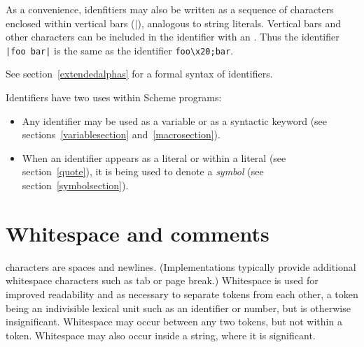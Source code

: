 As a convenience, idenfitiers may also be written as a sequence of
characters enclosed within vertical bars ({\cf $|$}), analogous to
string literals.  Vertical bars and other characters can be included
in the identifier with an .  Thus the
identifier \verb+|foo bar|+ is the same as the identifier
\verb+foo\x20;bar+.

See section~\ref{extendedalphas} for a formal syntax of identifiers.

\vest Identifiers have two uses within Scheme programs:
\begin{itemize}
\item Any identifier may be used as a variable
 or as a syntactic keyword
(see sections~\ref{variablesection} and~\ref{macrosection}).

\item When an identifier appears as a literal or within a literal
(see section~\ref{quote}), it is being used to denote a {\em symbol}
(see section~\ref{symbolsection}).

\end{itemize}

%
%


\section{Whitespace and comments}

 characters are spaces and newlines.
(Implementations typically provide additional whitespace characters such
as tab or page break.)  Whitespace is used for improved readability and
as necessary to separate tokens from each other, a token being an
indivisible lexical unit such as an identifier or number, but is
otherwise insignificant.  Whitespace may occur between any two tokens,
but not within a token.  Whitespace may also occur inside a string,
where it is significant.

